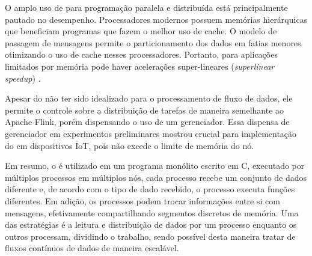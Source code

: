 O amplo uso de \mpi para programação paralela e distribuída está principalmente pautado no
desempenho. Processadores modernos possuem memórias hierárquicas que beneficiam
programas que fazem o melhor uso de cache. O modelo de passagem de mensagens
permite o particionamento dos dados em fatias menores otimizando o uso de cache
nesses processadores. Portanto, para aplicações limitados por memória pode haver
acelerações super-lineares (\emph{superlinear speedup}) \cite{mpi-book}.

Apesar do \mpi não ter sido idealizado para o processamento de fluxo de dados, ele
permite o controle sobre a distribuição de tarefas de maneira
semelhante ao Apache Flink, porém dispensando o uso de um
gerenciador. Essa dispensa de gerenciador em experimentos preliminares mostrou
crucial para implementação do \mfog em dispositivos IoT, pois não excede o limite de
memória do nó.

Em resumo, o \mpi é utilizado em um programa monólito escrito em C, executado
por múltiplos processos em múltiplos nós, cada processo recebe um conjunto de
dados diferente e, de acordo com o tipo de dado recebido, o processo executa
funções diferentes.
Em adição, os processos podem trocar informações entre si com mensagens,
efetivamente compartilhando segmentos discretos de memória.
Uma das estratégias é a leitura e distribuição de dados por um processo enquanto
os outros processam, dividindo o trabalho, sendo possível desta maneira tratar
de fluxos contínuos de dados de maneira escalável.

